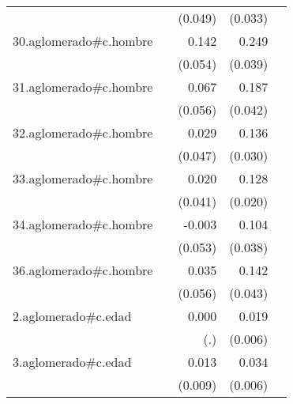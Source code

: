 {\begin{longtable}{l*{4}{D{.}{.}{-1}}}
            &                     &     (0.049)         &     (0.033)         &                     \\
\addlinespace
30.aglomerado#c.hombre&                     &       0.142\sym{**} &       0.249\sym{***}&                     \\
            &                     &     (0.054)         &     (0.039)         &                     \\
\addlinespace
31.aglomerado#c.hombre&                     &       0.067         &       0.187\sym{***}&                     \\
            &                     &     (0.056)         &     (0.042)         &                     \\
\addlinespace
32.aglomerado#c.hombre&                     &       0.029         &       0.136\sym{***}&                     \\
            &                     &     (0.047)         &     (0.030)         &                     \\
\addlinespace
33.aglomerado#c.hombre&                     &       0.020         &       0.128\sym{***}&                     \\
            &                     &     (0.041)         &     (0.020)         &                     \\
\addlinespace
34.aglomerado#c.hombre&                     &      -0.003         &       0.104\sym{**} &                     \\
            &                     &     (0.053)         &     (0.038)         &                     \\
\addlinespace
36.aglomerado#c.hombre&                     &       0.035         &       0.142\sym{***}&                     \\
            &                     &     (0.056)         &     (0.043)         &                     \\
\addlinespace
2.aglomerado#c.edad&                     &       0.000         &       0.019\sym{**} &                     \\
            &                     &         (.)         &     (0.006)         &                     \\
\addlinespace
3.aglomerado#c.edad&                     &       0.013         &       0.034\sym{***}&                     \\
            &                     &     (0.009)         &     (0.006)         &                     \\

\end{longtable}}
